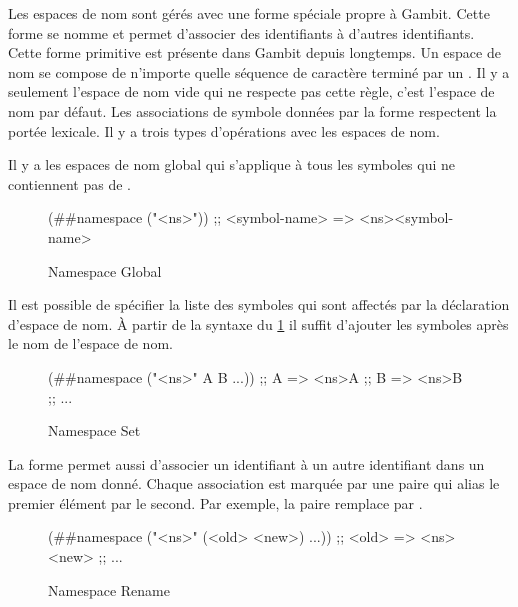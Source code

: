 Les espaces de nom sont gérés avec une forme spéciale propre à Gambit. Cette
forme se nomme  et permet d'associer des identifiants à
d'autres identifiants.  Cette forme primitive est présente dans Gambit depuis longtemps.  Un
espace de nom se compose de n'importe quelle séquence de caractère terminé par
un \lstcode{#}. Il y a seulement l'espace de nom vide qui ne respecte pas cette
règle, c'est l'espace de nom par défaut.  Les associations de symbole données
par la forme  respectent la portée lexicale. Il y a trois
types d'opérations avec les espaces de nom.

Il y a les espaces de nom global qui s'applique à tous les symboles qui ne
contiennent pas de \lstcode{#}. \\
\begin{figure}[ht]
  \centering
  \begin{mplisting}{0.6}
(##namespace ("<ns>"))
;; <symbol-name> => <ns><symbol-name>
\end{mplisting}
  \caption{Namespace Global}
  \label{fig:forms->namespace-global}
\end{figure}

Il est possible de spécifier la liste des symboles qui sont affectés par la
déclaration d'espace de nom. À partir de la syntaxe du
\ref{fig:forms->namespace-global} il suffit d'ajouter les symboles après le nom
de l'espace de nom.\\
\begin{figure}[ht]
  \centering
  \begin{mplisting}{0.6}
(##namespace ("<ns>" A B ...))
;; A => <ns>A
;; B => <ns>B
;; ...
\end{mplisting}
  \caption{Namespace Set}
  \label{fig:forms->namespace-set}
\end{figure}

La forme  permet aussi d'associer un identifiant à un
autre identifiant dans un espace de nom donné. Chaque association est marquée
par une paire qui alias le premier élément par le second. Par exemple, la paire
 remplace  par .\\
\begin{figure}[ht]
  \centering
  \begin{mplisting}{0.6}
(##namespace ("<ns>" (<old> <new>) ...))
;; <old> => <ns><new>
;; ...
\end{mplisting}
  \caption{Namespace Rename}
  \label{fig:forms->namespace-rename}
\end{figure}

